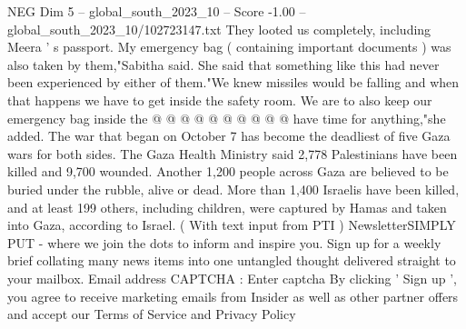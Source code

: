 \begin{textsample}{NEG Dim 5 – global\_south\_2023\_10 – Score -1.00 – global\_south\_2023\_10/102723147.txt}
They looted us completely, including Meera ' s passport.
My emergency bag ( containing important documents ) was also taken by them,"Sabitha said.
She said that something like this had never been experienced by either of them."We knew missiles would be falling and when that happens we have to get inside the safety room.
We are to also keep our emergency bag inside the @ @ @ @ @ @ @ @ @ @ have time for anything,"she added.
The war that began on October 7 has become the deadliest of five Gaza wars for both sides.
The Gaza Health Ministry said 2,778 Palestinians have been killed and 9,700 wounded.
Another 1,200 people across Gaza are believed to be buried under the rubble, alive or dead.
More than 1,400 Israelis have been killed, and at least 199 others, including children, were captured by Hamas and taken into Gaza, according to Israel. ( With text input from PTI ) NewsletterSIMPLY PUT - where we join the dots to inform and inspire you.
Sign up for a weekly brief collating many news items into one untangled thought delivered straight to your mailbox.
Email address CAPTCHA : Enter captcha By clicking ' Sign up ', you agree to receive marketing emails from Insider as well as other partner offers and accept our Terms of Service and Privacy Policy

\end{textsample}
